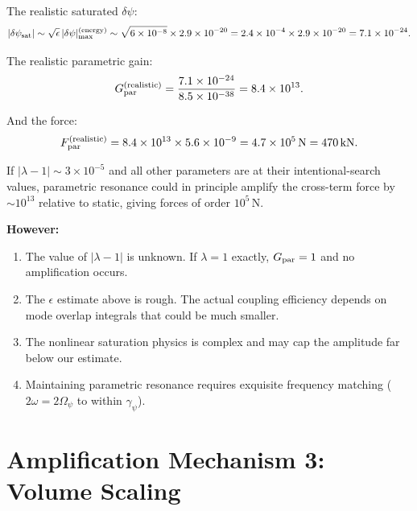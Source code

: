\documentclass[11pt]{article}
\begin{document}
The realistic saturated $\delta\psi$:
\begin{equation}
|\delta\psi_{\rm sat}| \sim \sqrt{\epsilon}\,|\delta\psi|_{\rm max}^{(\rm energy)}
  \sim \sqrt{6 \times 10^{-8}} \times 2.9 \times 10^{-20}
  = 2.4 \times 10^{-4} \times 2.9 \times 10^{-20}
  = 7.1 \times 10^{-24}.
\end{equation}

The realistic parametric gain:
\begin{equation}
G_{\rm par}^{(\rm realistic)}
  = \frac{7.1 \times 10^{-24}}{8.5 \times 10^{-38}}
  = 8.4 \times 10^{13}.
\end{equation}

And the force:
\begin{equation}
F_{\rm par}^{(\rm realistic)}
  = 8.4 \times 10^{13} \times 5.6 \times 10^{-9}
  = 4.7 \times 10^{5}\,\text{N} = 470\,\text{kN}.
\end{equation}

\begin{tcolorbox}[colback=yellow!5!white, colframe=yellow!50!black,
  title=Parametric Resonance: Enormous but Conditional]
If $|\lambda - 1| \sim 3 \times 10^{-5}$ and all other parameters are at
their intentional-search values, parametric resonance could in principle
amplify the cross-term force by $\sim 10^{13}$ relative to static, giving
forces of order $10^5$\,N.

\textbf{However:}
\begin{enumerate}
\item The value of $|\lambda - 1|$ is unknown. If $\lambda = 1$ exactly,
  $G_{\rm par} = 1$ and no amplification occurs.
\item The $\epsilon$ estimate above is rough. The actual coupling efficiency
  depends on mode overlap integrals that could be much smaller.
\item The nonlinear saturation physics is complex and may cap the amplitude
  far below our estimate.
\item Maintaining parametric resonance requires exquisite frequency matching
  ($2\omega = 2\Omega_\psi$ to within $\gamma_\psi$).
\end{enumerate}
\end{tcolorbox}

\section{Amplification Mechanism 3: Volume Scaling}\label{sec:volume}
\end{document}
